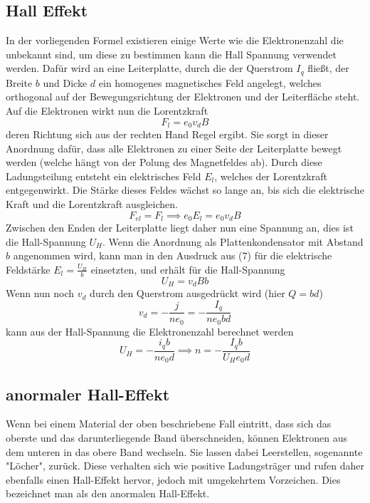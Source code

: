 \subsection{Hall Effekt}
In der vorliegenden Formel existieren einige Werte wie die Elektronenzahl die unbekannt sind, um diese zu bestimmen kann die Hall Spannung verwendet werden. Dafür wird an eine Leiterplatte, durch die der Querstrom $I_q$ fließt, der Breite $b$ und Dicke $d$ ein homogenes magnetisches Feld angelegt, welches orthogonal auf der Bewegungsrichtung der Elektronen und der Leiterfläche steht. Auf die Elektronen wirkt nun die Lorentzkraft
\begin{equation*}
F_l=e_0v_dB
\end{equation*}
deren Richtung sich aus der rechten Hand Regel ergibt. Sie sorgt in dieser Anordnung dafür, dass alle Elektronen zu einer Seite der Leiterplatte bewegt werden (welche hängt von der Polung des Magnetfeldes ab). Durch diese Ladungsteilung entsteht ein elektrisches Feld $E_l$, welches der Lorentzkraft entgegenwirkt. Die Stärke dieses Feldes wächst so lange an, bis sich die elektrische Kraft und die Lorentzkraft ausgleichen.
\begin{equation}
F_{el}=F_l \implies   e_0E_l=e_0v_dB
\end{equation}
Zwischen den Enden der Leiterplatte liegt daher nun eine Spannung an, dies ist die Hall-Spannung $U_H$. Wenn die Anordnung als Plattenkondensator mit Abstand $b$ angenommen wird, kann man in den Ausdruck aus (7) für die elektrische Feldstärke $E_l=\frac{U_H}{b}$ einsetzten, und erhält für die Hall-Spannung
\begin{equation}
U_H=v_dBb
\end{equation}
Wenn nun noch $v_d$ durch den Querstrom ausgedrückt wird (hier $Q=bd$)
\begin{equation}
v_d=-\frac{j}{ne_0}=-\frac{I_q}{ne_0bd}
\end{equation}
kann aus der Hall-Spannung die Elektronenzahl berechnet werden
\begin{equation}
   \label{eq:elektronenzahl}
U_H=-\frac{i_qb}{ne_0d} \implies n=-\frac{I_qb}{U_He_0d}
\end{equation}
\subsection{anormaler Hall-Effekt}
Wenn bei einem Material der oben beschriebene Fall eintritt, dass sich das oberste und das darunterliegende Band überschneiden, können Elektronen aus dem unteren in das obere Band wechseln. Sie lassen dabei Leerstellen, sogenannte "Löcher", zurück. Diese verhalten sich wie positive Ladungsträger und rufen daher ebenfalls einen Hall-Effekt hervor, jedoch mit umgekehrtem Vorzeichen. Dies bezeichnet man als den anormalen Hall-Effekt. 
